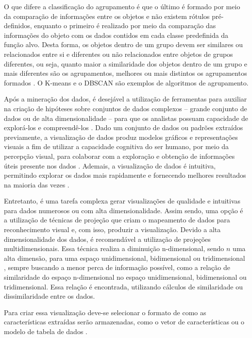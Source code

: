 		O que difere a classificação do agrupamento é que o último é formado por meio da
		comparação de informações entre os objetos e não existem rótulos pré-definidos,
		enquanto o primeiro é realizado por meio da comparação das informações do objeto
		com os dados contidos em cada classe predefinida da função alvo. Desta forma,
		os objetos dentro de um grupo devem ser similares ou relacionados entre si e
		diferentes ou não relacionados entre objetos de grupos diferentes, ou seja,
		quanto maior a similaridade dos objetos dentro de um grupo e mais diferentes
		são os agrupamentos, melhores ou mais distintos os agrupamentos formados \cite{Tan:2005:ch8}.
		O K-means \cite{macqueen1967} e o \ac{DBSCAN} \cite{Ester1996} são exemplos de
		algoritmos de agrupamento.

		Após a mineração dos dados, é desejável a utilização de ferramentas para
		auxiliar na criação de hipóteses sobre conjuntos de dados complexos -- grande
		conjunto de dados ou de alta dimensionalidade -- para que os analistas possuam
		capacidade de explorá-los e compreendê-los \cite{de2003}. Dado um conjunto de
		dados ou padrões extraídos previamente, a visualização de dados
		produz modelos gráficos e representações visuais a fim de utilizar a capacidade
		cognitiva do ser humano, por meio da percepção visual, para colaborar com
		a exploração e obtenção de informações úteis presente nos dados \cite{de2003,keim2002}.
		Ademais, a visualização de dados é intuitiva, permitindo explorar os dados
		mais rapidamente e fornecendo melhores resultados na maioria das vezes \cite{keim2002}.
		
		Entretanto, é uma tarefa complexa gerar visualizações de qualidade e intuitivas para
		dados numerosos ou com alta dimensionalidade. Assim sendo, uma opção é a utilização
		de técnicas de projeção que criam o mapeamento de dados para reconhecimento visual
		\cite{friedman1974} e, com isso, produzir a visualização. Devido a alta dimensionalidade
		dos dados, é recomendável a utilização de projeções multidimensionais. Essa técnica
		realiza a diminuição n-dimensional, sendo $n$ uma alta dimensão, para uma espaço
		unidimensional, bidimensional ou tridimensional \cite{paulovich2008least},
		sempre buscando a menor perca de informação possível, como a relação de
		similaridade do espaço n-dimensional no espaço unidimensional, bidimensional
		ou tridimensional. Essa relação é encontrada, utilizando cálculos de similaridade
		ou dissimilaridade entre os dados.		
		
		Para criar essa visualização deve-se selecionar o formato
		de como as características extraídas serão armazenadas, como o vetor de
		características ou o modelo de tabela de dados \cite{de2003}.

